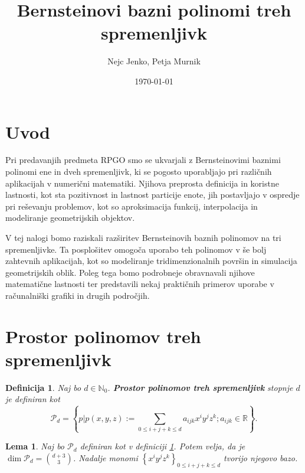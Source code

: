 \documentclass[11pt,a4paper]{article}
\title{\textbf{Bernsteinovi bazni polinomi treh spremenljivk}}
\author{Nejc Jenko, Petja Murnik}
\date{\today}
\newtheorem{definition}{Definicija}
\newtheorem{lemma}{Lema}
\begin{document}
\maketitle
\break

\section{Uvod}

Pri predavanjih predmeta RPGO smo se ukvarjali z Bernsteinovimi baznimi polinomi ene in dveh spremenljivk, ki se pogosto uporabljajo pri različnih aplikacijah v numerični matematiki. Njihova preprosta definicija in koristne lastnosti, kot sta pozitivnost in lastnost particije enote, jih postavljajo v ospredje pri reševanju problemov, kot so aproksimacija funkcij, interpolacija in modeliranje geometrijskih objektov.

V tej nalogi bomo raziskali razširitev Bernsteinovih baznih polinomov na tri spremenljivke. Ta posplošitev omogoča uporabo teh polinomov v še bolj zahtevnih aplikacijah, kot so modeliranje tridimenzionalnih površin in simulacija geometrijskih oblik. Poleg tega bomo podrobneje obravnavali njihove matematične lastnosti ter predstavili nekaj praktičnih primerov uporabe v računalniški grafiki in drugih področjih.


\section{Prostor polinomov treh spremenljivk} 

\begin{definition}\label{def_prostor}
    Naj bo $d \in \mathbb{N}_0$. \textbf{Prostor polinomov treh spremenljivk} stopnje $d$ je definiran kot
    \begin{equation}
        \mathcal{P}_d = \left\{ p | p(x, y, z) := \sum_{0 \le i  + j + k \le d} a_{ijk} x^i y^j z^k  ; a_{ijk} \in \mathbb{R}\right\}.
    \end{equation}
\end{definition}

\begin{lemma}
    Naj bo $\mathcal{P}_d$ definiran kot v definiciji \ref{def_prostor}.
    Potem velja, da je $\dim \mathcal{P}_d = \binom{d+3}{3} $. 
    Nadalje monomi $\left\{x^i y^j z^k \right\}_{0 \le i  + j + k \le d}$ tvorijo njegovo bazo.
\end{lemma}
\end{document}
